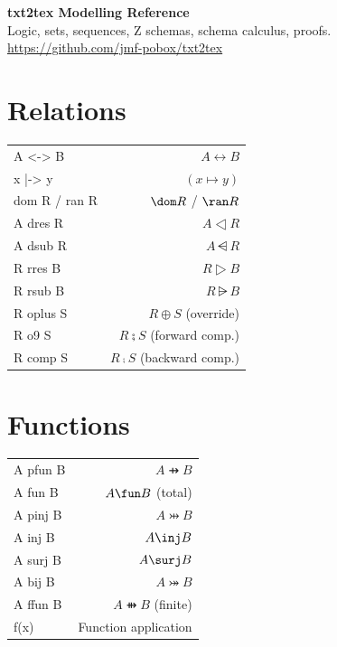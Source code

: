 \documentclass[10pt,landscape,a4paper]{article}
\begin{document}
\begin{center}
{\LARGE\bfseries txt2tex Modelling Reference}\\[2pt]
{\small Logic, sets, sequences, Z schemas, schema calculus, proofs.}\\[1pt]
{\footnotesize\color{gray}\url{https://github.com/jmf-pobox/txt2tex}}
\end{center}

\vspace{-2pt}

\begin{multicols}{3}
\raggedcolumns



\section{Relations}

\begin{tabularx}{\columnwidth}{LR}
A <-> B              & $A \rel B$ \\
x |-> y              & $(x \mapsto y)$ \\
dom R / ran R        & $\dom R$ / $\ran R$ \\
A dres R             & $A \dres R$ \\
A dsub R             & $A \ndres R$ \\
R rres B             & $R \rres B$ \\
R rsub B             & $R \nrres B$ \\
R oplus S            & $R \oplus S$ (override) \\
R o9 S               & $R \semi S$ (forward comp.) \\
R comp S             & $R \comp S$ (backward comp.) \\
\end{tabularx}

\section{Functions}

\begin{tabularx}{\columnwidth}{LR}
A pfun B             & $A \pfun B$ \\
A fun B              & $A \fun B$ (total) \\
A pinj B             & $A \pinj B$ \\
A inj B              & $A \inj B$ \\
A surj B             & $A \surj B$ \\
A bij B              & $A \bij B$ \\
A ffun B             & $A \ffun B$ (finite) \\
f(x)                 & Function application \\
\end{tabularx}


\end{multicols}
\end{document}
